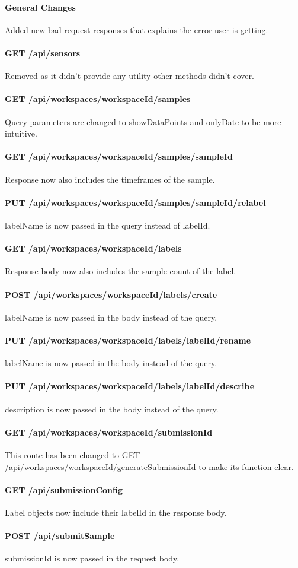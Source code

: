 \paragraph{General Changes} Added new bad request responses that explains the error user is getting.
\paragraph{GET /api/sensors} Removed as it didn't provide any utility other methods didn't cover.
\paragraph{GET /api/workspaces/{workspaceId}/samples} Query parameters are changed to showDataPoints and onlyDate to be more intuitive.
\paragraph{GET /api/workspaces/{workspaceId}/samples/{sampleId}} Response now also includes the timeframes of the sample.
\paragraph{PUT /api/workspaces/{workspaceId}/samples/{sampleId}/relabel} labelName is now passed in the query instead of labelId.
\paragraph{GET /api/workspaces/{workspaceId}/labels} Response body now also includes the sample count of the label.
\paragraph{POST /api/workspaces/{workspaceId}/labels/create} labelName is now passed in the body instead of the query.
\paragraph{PUT /api/workspaces/{workspaceId}/labels/{labelId}/rename} labelName is now passed in the body instead of the query.
\paragraph{PUT /api/workspaces/{workspaceId}/labels/{labelId}/describe} description is now passed in the body instead of the query.
\paragraph{GET /api/workspaces/{workspaceId}/submissionId} This route has been changed to GET /api/workspaces/{workspaceId}/generateSubmissionId to make its function clear.
\paragraph{GET /api/submissionConfig} Label objects now include their labelId in the response body.
\paragraph{POST /api/submitSample} submissionId is now passed in the request body.
